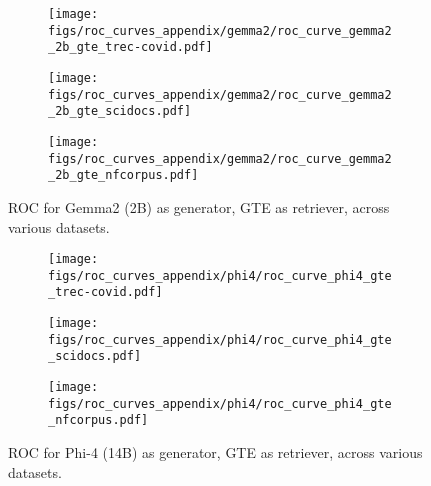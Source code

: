\begin{figure*}[t]
    \centering
    \begin{subfigure}[t]{0.32\textwidth}
        \centering
        \texttt{[image: figs/roc\_curves\_appendix/gemma2/roc\_curve\_gemma2\_2b\_gte\_trec-covid.pdf]}
        \label{fig:gemma2_treccovid}
    \end{subfigure}
    \begin{subfigure}[t]{0.32\textwidth}
        \centering
        \texttt{[image: figs/roc\_curves\_appendix/gemma2/roc\_curve\_gemma2\_2b\_gte\_scidocs.pdf]}
        \label{fig:gemma2_scidocs}
    \end{subfigure}
    \begin{subfigure}[t]{0.32\textwidth}
        \centering
        \texttt{[image: figs/roc\_curves\_appendix/gemma2/roc\_curve\_gemma2\_2b\_gte\_nfcorpus.pdf]}
    \end{subfigure}
    \label{fig:gemma2_nfcorpus}
    \caption{ROC for Gemma2 (2B) as generator, GTE as retriever, across various datasets.}
    \label{fig:rocs_gemma2}
\end{figure*}

\begin{figure*}[t]
    \centering
    \begin{subfigure}[t]{0.32\textwidth}
        \centering
        \texttt{[image: figs/roc\_curves\_appendix/phi4/roc\_curve\_phi4\_gte\_trec-covid.pdf]}
        \label{fig:phi4_treccovid}
    \end{subfigure}
    \begin{subfigure}[t]{0.32\textwidth}
        \centering
        \texttt{[image: figs/roc\_curves\_appendix/phi4/roc\_curve\_phi4\_gte\_scidocs.pdf]}
        \label{fig:phi4_scidocs}
    \end{subfigure}
    \begin{subfigure}[t]{0.32\textwidth}
        \centering
        \texttt{[image: figs/roc\_curves\_appendix/phi4/roc\_curve\_phi4\_gte\_nfcorpus.pdf]}
    \end{subfigure}
    \label{fig:phi4_nfcorpus}
    \caption{ROC for Phi-4 (14B) as generator, GTE as retriever, across various datasets.}
    \label{fig:rocs_phi4}
\end{figure*}

